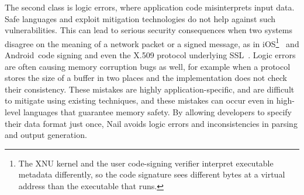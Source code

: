The second class is logic errors, where application code misinterprets input data. Safe languages
and exploit mitigation technologies do not help against such vulnerabilities. This can lead to
serious security consequences when two systems disagree on the meaning of a network packet or a
signed message, as in iOS\footnote{The XNU kernel and the user code-signing verifier interpret
  executable metadata differently, so the code signature sees different bytes at a virtual address
  than the executable that runs.}~\cite{evaders6} and Android~\cite{saurik-masterkey}code signing
and even the X.509 protocol underlying SSL~\cite{DBLP:conf/fc/KaminskyPS10}. Logic errors are often
causing memory corruption bugs as well, for example when a protocol stores the size of a buffer in
two places and the implementation does not check their consistency. These mistakes are
highly application-specific, and are difficult to mitigate using existing techniques, and these
mistakes can occur even in high-level languages that guarantee memory safety. By allowing developers
to specify their data format just once, Nail avoids logic errors and inconsistencies in parsing and
output generation.




